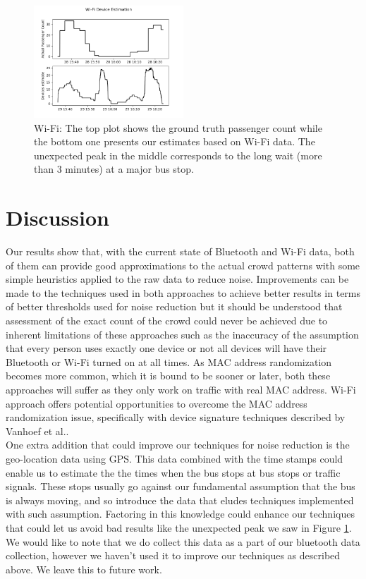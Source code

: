 \begin{figure}[!t]
\centering
\includegraphics[width=0.5\textwidth]{wifi_devices_estimate.png}
\caption{Wi-Fi: The top plot shows the ground truth passenger count while the bottom one presents our estimates based on Wi-Fi data. The unexpected peak in the middle corresponds to the long wait (more than 3 minutes) at a major bus stop.}
\label{fig:wifiestimate}
\end{figure}


\section{Discussion}
\label{sec:discussion}

Our results show that, with the current state of Bluetooth and Wi-Fi data, both of them can provide good approximations to the actual crowd patterns with some simple heuristics applied to the raw data to reduce noise. Improvements can be made to the techniques used in both approaches to achieve better results in terms of better thresholds used for noise reduction but it should be understood that assessment of the exact count of the crowd could never be achieved due to inherent limitations of these approaches such as the inaccuracy of the assumption that every person uses exactly one device or not all devices will have their Bluetooth or Wi-Fi turned on at all times. As MAC address randomization becomes more common, which it is bound to be sooner or later, both these approaches will suffer as they only work on traffic with real MAC address. Wi-Fi approach offers potential opportunities to overcome the MAC address randomization issue, specifically with device signature techniques described by Vanhoef et al.\cite{MacRandomization02}. \\

One extra addition that could improve our techniques for noise reduction is the  geo-location data using GPS. This data combined with the time stamps could enable us to estimate the the times when the bus stops at bus stops or traffic signals. These stops usually go against our fundamental assumption that the bus is always moving, and so introduce the data that eludes techniques implemented with such assumption. Factoring in this knowledge could enhance our techniques that could let us avoid bad results like the unexpected peak we saw in Figure \ref{fig:wifiestimate}. We would like to note that we do collect this data as a part of our bluetooth data collection, however we haven't used it to improve our techniques as described above. We leave this to future work.


